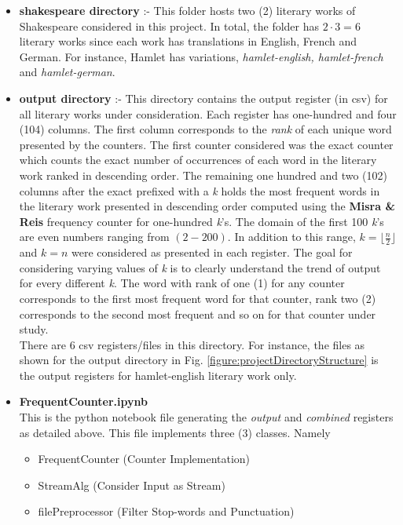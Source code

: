 \documentclass[longpaper, english, final, times]{revdetua}
\begin{document}
		\begin{itemize}
			\setlength\itemsep{1em}
			\item \textbf{shakespeare directory} :- This folder hosts two (2) literary works of Shakespeare considered in this project. In total, the folder has $2\cdot 3=6$ literary works since each work has translations in English, French and German. For instance, Hamlet has variations, \textit{hamlet-english, hamlet-french} and \textit{hamlet-german}.
			
			\item \textbf{output directory} :- This directory contains the output register (in csv) for all literary works under consideration. Each register has one-hundred and four (104) columns. The first column corresponds to the \textit{rank} of each unique word presented by the counters. The first counter considered was the exact counter which counts the exact number of occurrences of each word in the literary work ranked in descending order. The remaining one hundred and two (102) columns after the exact prefixed with a \textit{k} holds the most frequent words in the literary work presented in descending order computed using the \textbf{Misra \& Reis} \cite{misra_gries} frequency counter for one-hundred \textit{k}'s. The domain of the first 100 \textit{k}'s are even numbers ranging from $(2-200)$. In addition to this range, $k=\lfloor \frac{n}{2} \rfloor$ and $k=n$ were considered as presented in each register. The goal for considering varying values of \textit{k} is to clearly understand the trend of output for every different \textit{k}. The word with rank of one (1) for any counter corresponds to the first most frequent word for that counter, rank two (2) corresponds to the second most frequent and so on for that counter under study.\\
			
			There are $6$ csv registers/files in this directory. For instance, the files as shown for the output directory in Fig. \ref{figure:projectDirectoryStructure} is the output registers for hamlet-english literary work only.
			
			\item \textbf{FrequentCounter.ipynb} \\
				This is the python notebook file generating the \textit{output} and \textit{combined} registers as detailed above. This file implements three (3) classes. Namely
				\begin{itemize}
					\setlength\itemsep{0em}
					\item FrequentCounter (Counter Implementation)
					\item StreamAlg (Consider Input as Stream)
					\item filePreprocessor (Filter Stop-words and Punctuation)
				\end{itemize}
		\end{itemize}
	
\end{document}
